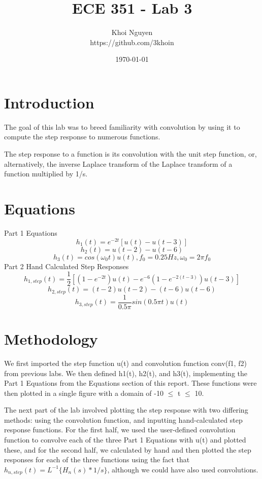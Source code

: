 \documentclass[11pt,a4,titlepage]{article}
\title{ECE 351 - Lab 3}
\author{Khoi Nguyen \\ https://github.com/3khoin}
\date{\today}
\begin{document}
\maketitle
\pagebreak
	
\tableofcontents
\pagebreak

\section{Introduction}
The goal of this lab was to breed familiarity with convolution by using it to compute the step response to numerous functions.

The step response to a function is its convolution with the unit step function, or, alternatively, the inverse Laplace transform of the Laplace transform of a function multiplied by 1/s.

\section{Equations}
Part 1 Equations
\[h_{1}(t) = e^{-2t}[u(t) - u(t-3)]\]
\[h_{2}(t) = u(t - 2) - u(t - 6)\]
\[h_{3}(t) = cos(\omega _{0}t) u(t),f_{0} = 0.25 Hz,\omega _{0} = 2\pi f_{0}\]
Part 2 Hand Calculated Step Responses
\[h_{1,step}(t) = \frac{1}{2}[(1 - e^{-2t})u(t) - e^{-6}(1 - e^{-2(t - 3)})u(t - 3)]\]
\[h_{2,step}(t) = (t - 2)u(t - 2) - (t - 6)u(t - 6)\]
\[h_{3,step}(t) = \frac{1}{0.5\pi}sin(0.5\pi t) u(t)\]

\section{Methodology}
We first imported the step function u(t) and convolution function conv(f1, f2) from previous labs. We then defined h1(t), h2(t), and h3(t), implementing the Part 1 Equations from the Equations section of this report. These functions were then plotted in a single figure with a domain of -10 $\leq$ t $\leq$ 10.

The next part of the lab involved plotting the step response with two differing methods: using the convolution function, and inputting hand-calculated step response functions. For the first half, we used the user-defined convolution function to convolve each of the three Part 1 Equations with u(t) and plotted these, and for the second half, we calculated by hand and then plotted the step responses for each of the three functions using the fact that $h_{n,step}(t) = L^{-1}\{H_{n}(s) * 1/s\}$, although we could have also used convolutions.
\end{document}
